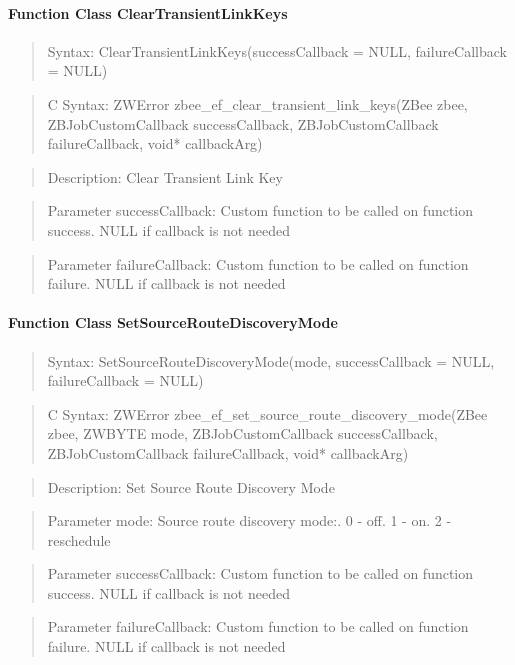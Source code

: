 \paragraph{Function Class ClearTransientLinkKeys}
\begin{quote}Syntax: ClearTransientLinkKeys(successCallback = NULL, failureCallback = NULL)\end{quote}
\begin{quote}C Syntax: ZWError zbee\_ef\_clear\_transient\_link\_keys(ZBee zbee, ZBJobCustomCallback successCallback, ZBJobCustomCallback failureCallback, void* callbackArg)\end{quote}
\begin{quote}Description: Clear Transient Link Key\end{quote}
\begin{quote}Parameter successCallback: Custom function to be called on function success. NULL if callback is not needed\end{quote}
\begin{quote}Parameter failureCallback: Custom function to be called on function failure. NULL if callback is not needed\end{quote}


\paragraph{Function Class SetSourceRouteDiscoveryMode}
\begin{quote}Syntax: SetSourceRouteDiscoveryMode(mode, successCallback = NULL, failureCallback = NULL)\end{quote}
\begin{quote}C Syntax: ZWError zbee\_ef\_set\_source\_route\_discovery\_mode(ZBee zbee, ZWBYTE mode, ZBJobCustomCallback successCallback, ZBJobCustomCallback failureCallback, void* callbackArg)\end{quote}
\begin{quote}Description: Set Source Route Discovery Mode\end{quote}
\begin{quote}Parameter mode: Source route discovery mode:. 0 - off. 1 - on. 2 - reschedule\end{quote}
\begin{quote}Parameter successCallback: Custom function to be called on function success. NULL if callback is not needed\end{quote}
\begin{quote}Parameter failureCallback: Custom function to be called on function failure. NULL if callback is not needed\end{quote}


